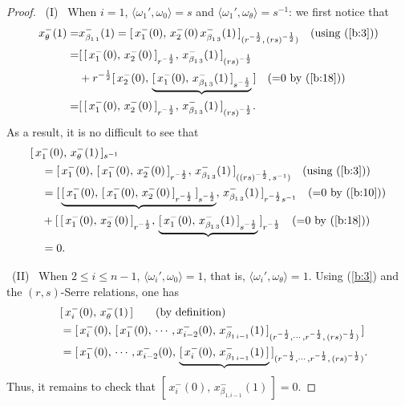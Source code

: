 \documentclass{amsproc}
\theoremstyle{remark}
\numberwithin{equation}{section}
\begin{document}
\begin{proof} \ (I) \ When $i=1$,
$\langle{\omega}_1',{\omega}_0\rangle=s$ and ${\langle}
{\omega}_1',{\omega}_\theta{\rangle}=s^{-1}$: we first notice that
\begin{equation*}
\begin{split}
x_{\theta}^-(1)=&x_{\beta_{1\,1}}^-(1)=[\,x_1^-(0),\,x_2^-(0)
\,x_{\beta_{1\,3}}^-(1)\,]_{(r^{-\frac{1}{2}},\,(rs)^{-\frac{1}{2}})}
\quad {\hbox{(using (\ref{b:3}))}}\\
=&[\,[\,x_1^-(0),\,x_{2}^-(0)\,]_{r^{-\frac{1}{2}}}
,\,x_{\beta_{1\,3}}^-(1)\,]_{(rs)^{-\frac{1}{2}}}\\
&+r^{-\frac{1}{2}}[\,x_2^-(0),\,
\underbrace{[\,x_{1}^-(0),\,x_{\beta_{1\,3}}^-(1)\,]_{s^{-\frac{1}{2}}}}
\,]\quad{\hbox{(=0 by (\ref{b:18}))}}\\
=&[\,[\,x_1^-(0),\,x_{2}^-(0)\,]_{r^{-\frac{1}{2}}}
,\,x_{\beta_{1\,3}}^-(1)\,]_{(rs)^{-\frac{1}{2}}}.
\end{split}
\end{equation*}
As a result, it is no difficult to see that
\begin{eqnarray*}
\begin{split}
&[\,x_1^-(0),\,x_{\theta}^-(1)\,]_{s^{-1}}\\
&\quad=[\,x_1^-(0),\,[\,x_{1}^-(0),\,x_2^-(0)\,]_{r^{-\frac{1}{2}}}
,\,x_{\beta_{1\,3}}^-(1)\,]_{((rs)^{-\frac{1}{2}},\,s^{-1})}\quad{\hbox{(using (\ref{b:3}))}}\\
&\quad=[\,\underbrace{[\,x_1^-(0),\,[\,x_{1}^-(0),\,x_2^-(0)\,]_{r^{-\frac{1}{2}}}
\,]_{s^{-\frac{1}{2}}}}
,\,x_{\beta_{1\,3}}^-(1)\,]_{r^{-\frac{1}{2}}s^{-1}}\quad{\hbox{(=0 by (\ref{b:10}))}}\\
&\quad+[\,[\,x_{1}^-(0),\,x_2^-(0)\,]_{r^{-\frac{1}{2}}}
,\,\underbrace{[\,x_1^-(0),\,x_{\beta_{1\,3}}^-(1)\,]_{s^{-\frac{1}{2}}}}
\,]_{r^{-\frac{1}{2}}}\quad{\hbox{(=0 by (\ref{b:18}))}}\\
&\quad=0.
\end{split}
\end{eqnarray*}

\ (II) \ When $2\leqslant i \leqslant n-1$,
$\langle{\omega}_{i}',{\omega}_0\rangle=1$, that is, ${\langle}
{\omega}_{i}',{\omega}_\theta{\rangle}=1$. Using (\ref{b:3}) and the $(r,s)$-Serre relations, one
has
\begin{eqnarray*}
\begin{split}
&\quad[\,x_i^-{(0)},\, x_{\theta}^-(1)\,]
\qquad {\hbox{(by definition)}}\\
&\quad=[\,x_i^-(0),\,[\,x_{1}^-(0),\,\cdots, x_{i-2}^-(0),\,
x_{\beta_{1\,i-1}}^-(1)\,]_{(r^{-\frac{1}{2}},\cdots,r^{-\frac{1}{2}}
,\,(rs)^{-\frac{1}{2}})}\,]\\
&\quad=[\,x_{1}^-(0),\,\cdots, x_{i-2}^-(0),\,
\underbrace{[\,x_i^-(0),\,x_{\beta_{1\,i-1}}^-(1)\,]}
\,]_{(r^{-\frac{1}{2}},\cdots,r^{-\frac{1}{2}},\,(rs)^{-\frac{1}{2}})}.
\end{split}
\end{eqnarray*}
Thus, it remains to check that
$[\,x_i^-(0),\,x_{\beta_{1,i-1}}^-(1)\,]=0$.


\end{proof}
\end{document}

